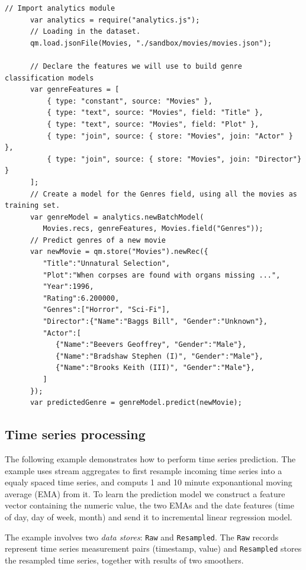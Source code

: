 \documentclass{article} %
\begin{document}
      \begin{lstlisting}[caption={Text mining: storage, feature extraction, classification and regression}] 	
      // Import analytics module
      var analytics = require("analytics.js");
      // Loading in the dataset.
      qm.load.jsonFile(Movies, "./sandbox/movies/movies.json");
       	
      // Declare the features we will use to build genre classification models
      var genreFeatures = [
          { type: "constant", source: "Movies" },
          { type: "text", source: "Movies", field: "Title" },
          { type: "text", source: "Movies", field: "Plot" },
          { type: "join", source: { store: "Movies", join: "Actor" } },
          { type: "join", source: { store: "Movies", join: "Director"} }
      ];
      // Create a model for the Genres field, using all the movies as training set.
      var genreModel = analytics.newBatchModel(
         Movies.recs, genreFeatures, Movies.field("Genres"));
      // Predict genres of a new movie
      var newMovie = qm.store("Movies").newRec({
         "Title":"Unnatural Selection",
         "Plot":"When corpses are found with organs missing ...",
         "Year":1996,
         "Rating":6.200000,
         "Genres":["Horror", "Sci-Fi"],
         "Director":{"Name":"Baggs Bill", "Gender":"Unknown"},
         "Actor":[
            {"Name":"Beevers Geoffrey", "Gender":"Male"},
            {"Name":"Bradshaw Stephen (I)", "Gender":"Male"},
            {"Name":"Brooks Keith (III)", "Gender":"Male"},
         ]
      });
      var predictedGenre = genreModel.predict(newMovie);
      \end{lstlisting}

\subsection{Time series processing}

The following example demonstrates how to perform time series prediction. The example uses stream aggregates to first resample incoming time series into a equaly spaced time series, and computs 1 and 10 minute exponantional moving average (EMA) from it. To learn the prediction model we construct a feature vector containing the numeric value, the two EMAs and the date features (time of day, day of week, month) and send it to incremental linear regression model.

The example involves two \emph{data stores}: \texttt{Raw} and \texttt{Resampled}. The \texttt{Raw} records represent time series measurement pairs (timestamp, value) and \texttt{Resampled} stores the resampled time series, together with results of two smoothers.
\end{document}
